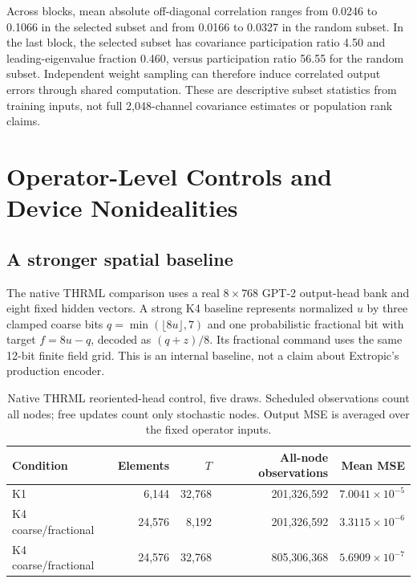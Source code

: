\documentclass[11pt]{article}
\begin{document}
Across blocks, mean absolute off-diagonal correlation ranges from 0.0246 to 0.1066 in the selected subset and from 0.0166 to 0.0327 in the random subset. In the last block, the selected subset has covariance participation ratio 4.50 and leading-eigenvalue fraction 0.460, versus participation ratio 56.55 for the random subset. Independent weight sampling can therefore induce correlated output errors through shared computation. These are descriptive subset statistics from training inputs, not full 2,048-channel covariance estimates or population rank claims.


\section{Operator-Level Controls and Device Nonidealities}
\subsection{A stronger spatial baseline}
The native THRML comparison uses a real $8\times768$ GPT-2 output-head bank and eight fixed hidden vectors. A strong K4 baseline represents normalized $u$ by three clamped coarse bits $q=\min(\lfloor8u\rfloor,7)$ and one probabilistic fractional bit with target $f=8u-q$, decoded as $(q+z)/8$. Its fractional command uses the same 12-bit finite field grid. This is an internal baseline, not a claim about Extropic's production encoder.

\begin{table}[!htbp]\centering\small
\caption{Native THRML reoriented-head control, five draws. Scheduled observations count all nodes; free updates count only stochastic nodes. Output MSE is averaged over the fixed operator inputs.}\label{tab:native}
\begin{tabular}{lrrrr}\toprule
Condition & Elements & $T$ & All-node observations & Mean MSE\\\midrule
K1 & 6,144 & 32,768 & 201,326,592 & $7.0041\!\times\!10^{-5}$\\
K4 coarse/fractional & 24,576 & 8,192 & 201,326,592 & $3.3115\!\times\!10^{-6}$\\
K4 coarse/fractional & 24,576 & 32,768 & 805,306,368 & $5.6909\!\times\!10^{-7}$\\\bottomrule
\end{tabular}
\end{table}
\end{document}
